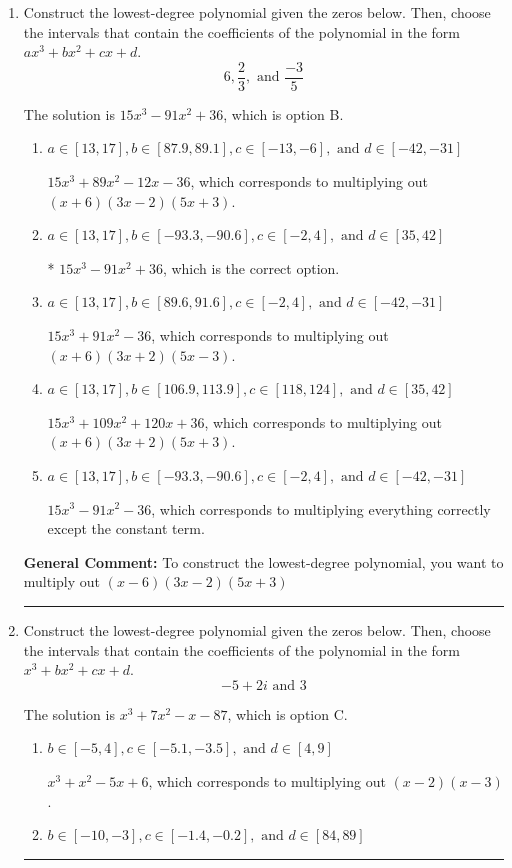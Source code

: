 \documentclass{extbook}[14pt]
\newcommand{\litem}[1]{\item #1

\rule{\textwidth}{0.4pt}}
\begin{document}
\begin{enumerate}\litem{
Construct the lowest-degree polynomial given the zeros below. Then, choose the intervals that contain the coefficients of the polynomial in the form $ax^3+bx^2+cx+d$.
\[ 6, \frac{2}{3}, \text{ and } \frac{-3}{5} \]

The solution is \( 15x^{3} -91 x^{2} + 36 \), which is option B.\begin{enumerate}[label=\Alph*.]
\item \( a \in [13, 17], b \in [87.9, 89.1], c \in [-13, -6], \text{ and } d \in [-42, -31] \)

$15x^{3} +89 x^{2} -12 x -36$, which corresponds to multiplying out $(x + 6)(3x -2)(5x + 3)$.
\item \( a \in [13, 17], b \in [-93.3, -90.6], c \in [-2, 4], \text{ and } d \in [35, 42] \)

* $15x^{3} -91 x^{2} + 36$, which is the correct option.
\item \( a \in [13, 17], b \in [89.6, 91.6], c \in [-2, 4], \text{ and } d \in [-42, -31] \)

$15x^{3} +91 x^{2} -36$, which corresponds to multiplying out $(x + 6)(3x + 2)(5x -3)$.
\item \( a \in [13, 17], b \in [106.9, 113.9], c \in [118, 124], \text{ and } d \in [35, 42] \)

$15x^{3} +109 x^{2} +120 x + 36$, which corresponds to multiplying out $(x + 6)(3x + 2)(5x + 3)$.
\item \( a \in [13, 17], b \in [-93.3, -90.6], c \in [-2, 4], \text{ and } d \in [-42, -31] \)

$15x^{3} -91 x^{2} -36$, which corresponds to multiplying everything correctly except the constant term.
\end{enumerate}

\textbf{General Comment:} To construct the lowest-degree polynomial, you want to multiply out $(x -6)(3x -2)(5x + 3)$
}
\litem{
Construct the lowest-degree polynomial given the zeros below. Then, choose the intervals that contain the coefficients of the polynomial in the form $x^3+bx^2+cx+d$.
\[ -5 + 2 i \text{ and } 3 \]

The solution is \( x^{3} +7 x^{2} -x -87 \), which is option C.\begin{enumerate}[label=\Alph*.]
\item \( b \in [-5, 4], c \in [-5.1, -3.5], \text{ and } d \in [4, 9] \)

$x^{3} + x^{2} -5 x + 6$, which corresponds to multiplying out $(x -2)(x -3)$.
\item \( b \in [-10, -3], c \in [-1.4, -0.2], \text{ and } d \in [84, 89] \)


\end{enumerate}}
\end{enumerate}
\end{document}
